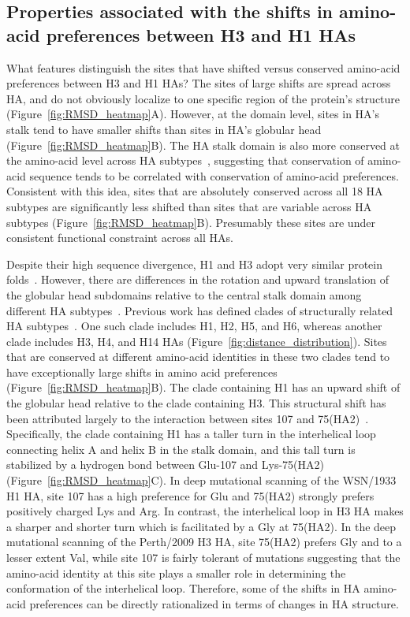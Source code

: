 \documentclass[9pt,twocolumn,twoside]{pnas-new}
\begin{document}
\subsection*{Properties associated with the shifts in amino-acid preferences between H3 and H1 HAs}
What features distinguish the sites that have shifted versus conserved amino-acid preferences between H3 and H1 HAs?
The sites of large shifts are spread across HA, and do not obviously localize to one specific region of the protein's structure (Figure~\ref{fig:RMSD_heatmap}A).
However, at the domain level, sites in HA's stalk tend to have smaller shifts than sites in HA's globular head (Figure~\ref{fig:RMSD_heatmap}B). 
The HA stalk domain is also more conserved at the amino-acid level across HA subtypes~\cite{nobusawa1991comparison,hai2012influenza,mallajosyula2014influenza}, suggesting that conservation of amino-acid sequence tends to be correlated with conservation of amino-acid preferences.
Consistent with this idea, sites that are absolutely conserved across all 18 HA subtypes are significantly less shifted than sites that are variable across HA subtypes (Figure~\ref{fig:RMSD_heatmap}B).
Presumably these sites are under consistent functional constraint across all HAs.

Despite their high sequence divergence, H1 and H3 adopt very similar protein folds~\cite{ha2002h5,russell2004h1}.
However, there are differences in the rotation and upward translation of the globular head subdomains relative to the central stalk domain among different HA subtypes~\cite{ha2002h5,russell2004h1}.
Previous work has defined clades of structurally related HA subtypes~\cite{ha2002h5,russell2004h1}. 
One such clade includes H1, H2, H5, and H6, whereas another clade includes H3, H4, and H14 HAs (Figure~\ref{fig:distance_distribution}).
Sites that are conserved at different amino-acid identities in these two clades tend to have exceptionally large shifts in amino acid preferences (Figure~\ref{fig:RMSD_heatmap}B).
The clade containing H1 has an upward shift of the globular head relative to the clade containing H3.
This structural shift has been attributed largely to the interaction between sites 107 and 75(HA2)~\cite{ha2002h5,russell2004h1}.
Specifically, the clade containing H1 has a taller turn in the interhelical loop connecting helix A and helix B in the stalk domain, and this tall turn is stabilized by a hydrogen bond between Glu-107 and Lys-75(HA2) (Figure~\ref{fig:RMSD_heatmap}C).
In deep mutational scanning of the WSN/1933 H1 HA, site 107 has a high preference for Glu and 75(HA2) strongly prefers positively charged Lys and Arg.
In contrast, the interhelical loop in H3 HA makes a sharper and shorter turn which is facilitated by a Gly at 75(HA2).
In the deep mutational scanning of the Perth/2009 H3 HA, site 75(HA2) prefers Gly and to a lesser extent Val, while site 107 is fairly tolerant of mutations suggesting that the amino-acid identity at this site plays a smaller role in determining the conformation of the interhelical loop.
Therefore, some of the shifts in HA amino-acid preferences can be directly rationalized in terms of changes in HA structure.
\end{document}
